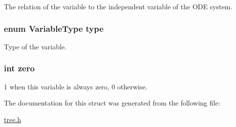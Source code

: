 The relation of the variable to the independent variable of the O\-D\-E system. 

\hypertarget{structVariable_a6d3af05ac5e896c45aeb8834fcbf84f4}{
\subsubsection[{type}]{\setlength{\rightskip}{0pt plus 5cm}enum {\bf Variable\-Type} type}}\label{structVariable_a6d3af05ac5e896c45aeb8834fcbf84f4}


Type of the variable. 

\hypertarget{structVariable_a627f44b64b5d8d3ae8cb6a675f164405}{
\subsubsection[{zero}]{\setlength{\rightskip}{0pt plus 5cm}int zero}}\label{structVariable_a627f44b64b5d8d3ae8cb6a675f164405}


1 when this variable is always zero, 0 otherwise. 



The documentation for this struct was generated from the following file\-:\begin{DoxyCompactItemize}
\item 
\hyperlink{tree_8h}{tree.\-h}\end{DoxyCompactItemize}
